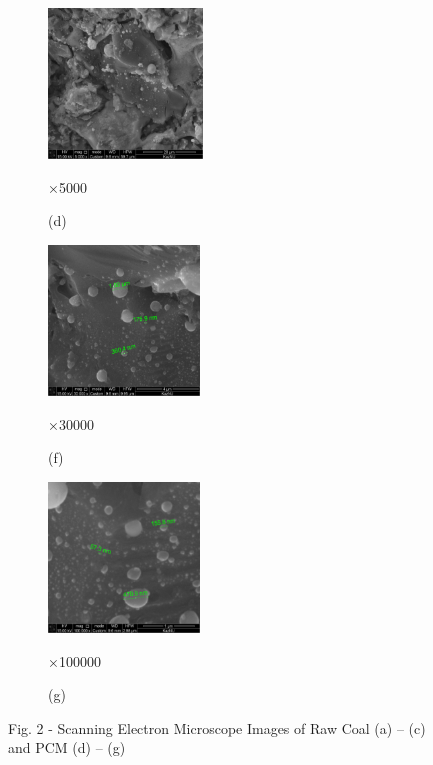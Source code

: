 \begin{figure}[H]
    \centering
    \begin{subfigure}[b]{0.32\textwidth}
        \centering
        \includegraphics[height=4cm]{assets/1093}
        \caption*{×5000}
        \caption*{(d)}
    \end{subfigure}
    \hfill
    \begin{subfigure}[b]{0.32\textwidth}
        \centering
        \includegraphics[height=4cm]{assets/1094}
        \caption*{×30000}
        \caption*{(f)}
    \end{subfigure}
    \hfill
    \begin{subfigure}[b]{0.32\textwidth}
        \centering
        \includegraphics[height=4cm]{assets/1095}
        \caption*{×100000}
        \caption*{(g)}
    \end{subfigure}
    \caption*{Fig. 2 - Scanning Electron Microscope Images of Raw Coal (a) -- (c) and PCM (d) -- (g)}
\end{figure}


